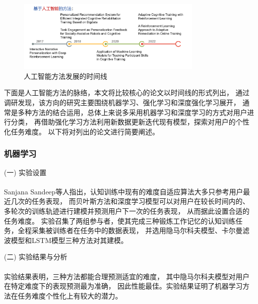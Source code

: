 \documentclass{article}
\begin{document}
        \subsubsection{}
        \begin{figure}[H]
            	
            \centering
            \includegraphics[width=0.8\textwidth]{images/timeline_AI.png}
            \caption{人工智能方法发展的时间线}
            \label{fig:label}
        \end{figure}
        下面是人工智能方法的脉络，本文将比较核心的论文以时间线的形式列出，
        通过调研发现，该方向的研究主要围绕机器学习、强化学习和深度强化学习展开，
        通常是多种方法的结合运用，总体上来说多采用机器学习和深度学习的方式对用户进行分类，
        再借助强化学习方法利用新数据更新迭代现有模型，探索对用户的个性化任务难度。
        以下将对列出的论文进行简要阐述。

        \subsubsection{机器学习}
            (一) 实验设置\paragraph{}
            Sanjana Sandeep\cite{ref16}等人指出，认知训练中现有的难度自适应算法大多只参考用户最近几次的任务表现，
            而贝叶斯方法和深度学习模型可以对用户在较长时间内的、多轮次的训练轨迹进行建模并预测用户下一次的任务表现，
            从而据此设置合适的任务难度。
            实验召集了两组参与者，使其完成三种锻炼工作记忆的认知训练任务，全程采集被训练者在任务中的数据表现，
            并选用隐马尔科夫模型、卡尔曼滤波模型和LSTM模型三种方法对其建模。

            (二) 实验结果与分析\paragraph{}
            实验结果表明，三种方法都能合理预测适宜的难度，
            其中隐马尔科夫模型对用户在特定难度下的表现预测最为准确，
            因此性能最佳。实验结果证明了机器学习方法在任务难度个性化上有较大的潜力。
\end{document}
